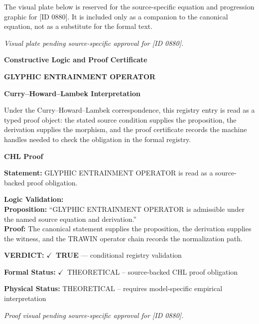 \begingroup\footnotesize\sloppy
The visual plate below is reserved for the source-specific equation and progression graphic for [ID 0880]. It is included only as a companion to the canonical equation, not as a substitute for the formal text.
\par\endgroup
\begingroup\footnotesize\itshape
Visual plate pending source-specific approval for [ID 0880].
\par\endgroup

\clearpage
\begingroup\tzpsupportsetup
\noindent\textbf{\fontsize{10.8pt}{12.8pt}\selectfont [ID 0880] Constructive Logic and Proof Certificate}\par
\noindent\textbf{\fontsize{10pt}{12pt}\selectfont GLYPHIC ENTRAINMENT OPERATOR}\par
\vspace{0.45em}
\begingroup
\footnotesize
\setlength{\parskip}{0.22em}
\setlength{\parindent}{0pt}
\noindent\textbf{Curry--Howard--Lambek Interpretation}\par
Under the Curry--Howard--Lambek correspondence, this registry entry is read as a typed proof
object: the stated source condition supplies the proposition, the derivation supplies the
morphism, and the proof certificate records the machine handles needed to check the obligation
in the formal registry.

\vspace{0.45em}
\noindent\textbf{CHL Proof}\par
\textbf{Statement:} GLYPHIC ENTRAINMENT OPERATOR is read as a source-backed proof obligation.

\textbf{Logic Validation:}\\
\textbf{Proposition:} ``GLYPHIC ENTRAINMENT OPERATOR is admissible under the named source equation and derivation.''\\
\textbf{Proof:} The canonical statement supplies the proposition, the derivation supplies the witness, and the TRAWIN operator chain records the normalization path.

\textbf{VERDICT:} \ensuremath{\checkmark}\ \textbf{TRUE} --- conditional registry validation

\textbf{Formal Status:} \ensuremath{\checkmark}\ THEORETICAL -- source-backed CHL proof obligation

\textbf{Physical Status:} THEORETICAL -- requires model-specific empirical interpretation
\par\vspace{0.45em}
\par
\vfill
\begingroup\footnotesize\itshape
Proof visual pending source-specific approval for [ID 0880].
\par\endgroup
\vfill
\endgroup
\endgroup
